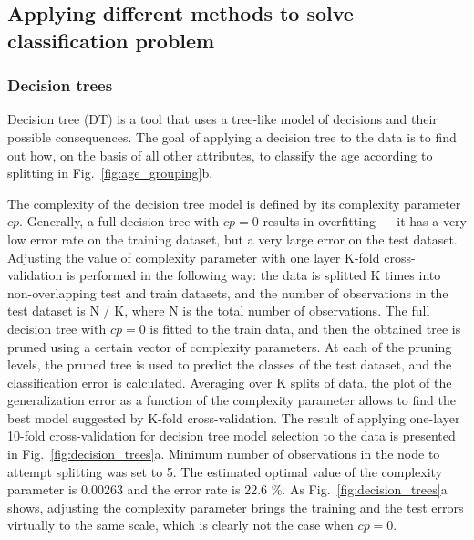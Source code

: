 \documentclass[10pt, paper=a4]{article}
\begin{document}
\subsection{Applying different methods to solve classification problem}
\subsubsection{Decision trees} %
Decision tree (DT) is a tool that uses a tree-like model of decisions
and their possible consequences.  The goal of applying a decision tree
to the data is to find out how, on the basis of all other attributes,
to classify the age according to splitting in
Fig.~\ref{fig:age_grouping}b.

The complexity of the decision tree model is defined by its complexity
parameter $cp$.  Generally, a full decision tree with $cp = 0$ results
in overfitting --- it has a very low error rate on the training
dataset, but a very large error on the test dataset.  Adjusting the
value of complexity parameter with one layer K-fold cross-validation
is performed in the following way: the data is splitted K times into
non-overlapping test and train datasets, and the number of
observations in the test dataset is N / K, where N is the total number
of observations.  The full decision tree with $cp = 0$ is fitted to
the train data, and then the obtained tree is pruned using a certain
vector of complexity parameters.  At each of the pruning levels, the
pruned tree is used to predict the classes of the test dataset, and
the classification error is calculated.  Averaging over K splits of
data, the plot of the generalization error as a function of the
complexity parameter allows to find the best model suggested by K-fold
cross-validation.  The result of applying one-layer 10-fold
cross-validation for decision tree model selection to the data is
presented in Fig.~\ref{fig:decision_trees}a.  Minimum number of
observations in the node to attempt splitting was set to 5.  The
estimated optimal value of the complexity parameter is 0.00263 and the
error rate is 22.6 \%.  As Fig.~\ref{fig:decision_trees}a shows,
adjusting the complexity parameter brings the training and the test
errors virtually to the same scale, which is clearly not the case when
$cp = 0$.
\end{document}
